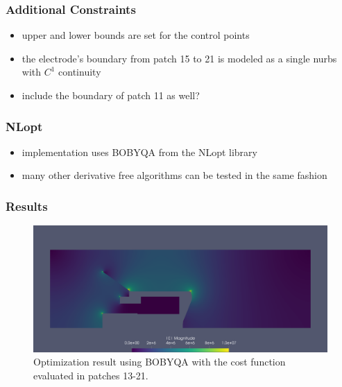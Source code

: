 \subsubsection{Additional Constraints}
\begin{itemize}
   \item upper and lower bounds are set for the control points
   \item the electrode's boundary from patch 15 to 21 is modeled as a single nurbs with $C^1$ continuity
   \item include the boundary of patch 11 as well?
\end{itemize}

\subsubsection{NLopt}
\begin{itemize}
   \item implementation uses BOBYQA from the NLopt library
   \item many other derivative free algorithms can be tested in the same fashion
\end{itemize}


\subsubsection{Results}
\begin{center}
\begin{figure}[H]
  \includegraphics[width=\textwidth]{figures/200kV/bobyqa_run6_newgeometry}
  \caption{Optimization result using BOBYQA with the cost function evaluated in patches 13-21.}
\end{figure}
\end{center}

